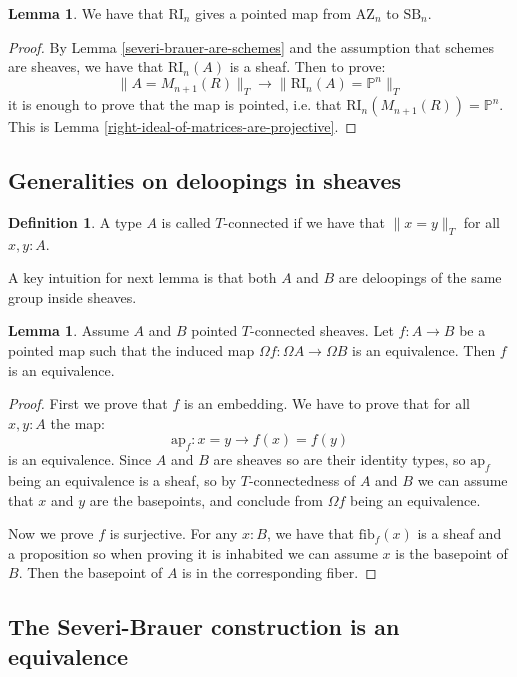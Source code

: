 \documentclass[10pt,a4paper]{article}
\theoremstyle{definition}
\newtheorem{lemma}[theorem]{Lemma}
\newtheorem{definition}[theorem]{Definition}
\newcommand{\SB}{\mathrm{SB}}
\newcommand{\RI}{\mathrm{RI}}
\newcommand{\AZ}{\mathrm{AZ}}
\newcommand{\propTrunc}[1]{\lVert #1 \rVert}
\newcommand{\bP}{\mathbb{P}}
\newcommand{\fib}{\mathrm{fib}}
\begin{document}
\begin{lemma}
We have that $\RI_n$ gives a pointed map from $\AZ_n$ to $\SB_n$.
\end{lemma}

\begin{proof}
By Lemma \ref{severi-brauer-are-schemes} and the assumption that schemes are sheaves, we have that $\RI_n(A)$ is a sheaf. Then to prove:
\[\propTrunc{A=M_{n+1}(R)}_T \to \propTrunc{\RI_n(A)=\bP^n}_T\]
it is enough to prove that the map is pointed, i.e. that $\RI_n(M_{n+1}(R)) = \bP^n$. This is Lemma \ref{right-ideal-of-matrices-are-projective}.
\end{proof}


\subsection{Generalities on deloopings in sheaves}

\begin{definition}
A type $A$ is called $T$-connected if we have that $\propTrunc{x=y}_T$ for all $x,y:A$.
\end{definition}

A key intuition for next lemma is that both $A$ and $B$ are deloopings of the same group inside sheaves.

\begin{lemma}\label{deloopings-equivalence}
Assume $A$ and $B$ pointed $T$-connected sheaves. Let $f:A\to B$ be a pointed map such that the induced map $\Omega f : \Omega A \to \Omega B$ is an equivalence. Then $f$ is an equivalence.
\end{lemma}

\begin{proof}
First we prove that $f$ is an embedding. We have to prove that for all $x,y:A$ the map:
\[\mathrm{ap}_f : x=y \to f(x)=f(y)\]
is an equivalence. Since $A$ and $B$ are sheaves so are their identity types, so $\mathrm{ap}_f$ being an equivalence is a sheaf, so by $T$-connectedness of $A$ and $B$ we can assume that $x$ and $y$ are the basepoints, and conclude from $\Omega f$ being an equivalence.

Now we prove $f$ is surjective. For any $x:B$, we have that $\fib_f(x)$ is a sheaf and a proposition so when proving it is inhabited we can assume $x$ is the basepoint of $B$. Then the basepoint of $A$ is in the corresponding fiber.
\end{proof}



\subsection{The Severi-Brauer construction is an equivalence}
\end{document}
